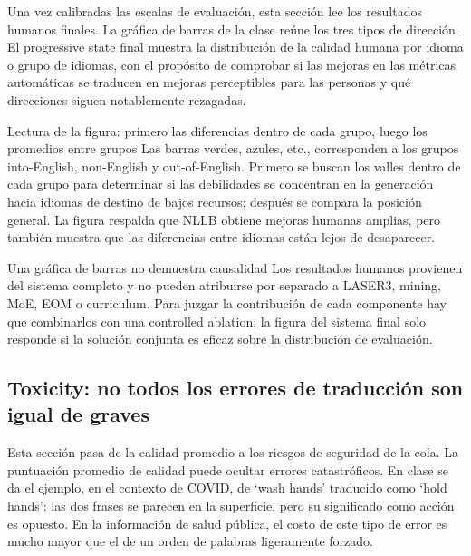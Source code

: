 Una vez calibradas las escalas de evaluación, esta sección lee los resultados humanos finales. La gráfica de barras de la clase reúne los tres tipos de dirección. El progressive state final muestra la distribución de la calidad humana por idioma o grupo de idiomas, con el propósito de comprobar si las mejoras en las métricas automáticas se traducen en mejoras perceptibles para las personas y qué direcciones siguen notablemente rezagadas.


\begin{knowledgebox}{Lectura de la figura: primero las diferencias dentro de cada grupo, luego los promedios entre grupos}
Las barras verdes, azules, etc., corresponden a los grupos into-English, non-English y out-of-English. Primero se buscan los valles dentro de cada grupo para determinar si las debilidades se concentran en la generación hacia idiomas de destino de bajos recursos; después se compara la posición general. La figura respalda que NLLB obtiene mejoras humanas amplias, pero también muestra que las diferencias entre idiomas están lejos de desaparecer.
\end{knowledgebox}

\begin{warningbox}{Una gráfica de barras no demuestra causalidad}
Los resultados humanos provienen del sistema completo y no pueden atribuirse por separado a LASER3, mining, MoE, EOM o curriculum. Para juzgar la contribución de cada componente hay que combinarlos con una controlled ablation; la figura del sistema final solo responde si la solución conjunta es eficaz sobre la distribución de evaluación.
\end{warningbox}

\subsection{Toxicity: no todos los errores de traducción son igual de graves}

Esta sección pasa de la calidad promedio a los riesgos de seguridad de la cola. La puntuación promedio de calidad puede ocultar errores catastróficos. En clase se da el ejemplo, en el contexto de COVID, de `wash hands' traducido como `hold hands': las dos frases se parecen en la superficie, pero su significado como acción es opuesto. En la información de salud pública, el costo de este tipo de error es mucho mayor que el de un orden de palabras ligeramente forzado.

